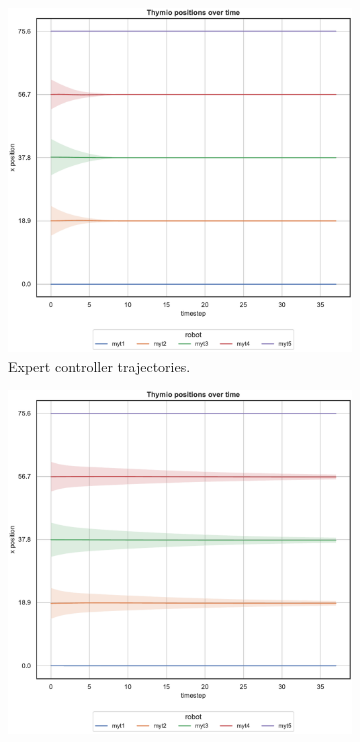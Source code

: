 \begin{figure}[H]
	\begin{center}
		\begin{subfigure}[h]{0.49\textwidth}
			\centering
			\includegraphics[width=\textwidth]{contents/images/net-d1/position-overtime-omniscient}%
			\caption{Expert controller trajectories.}
		\end{subfigure}
		\hfill
		\begin{subfigure}[h]{0.49\textwidth}
			\centering
			\includegraphics[width=\textwidth]{contents/images/net-d1/position-overtime-learned_distributed}

\end{subfigure}
\end{center}
\end{figure}
